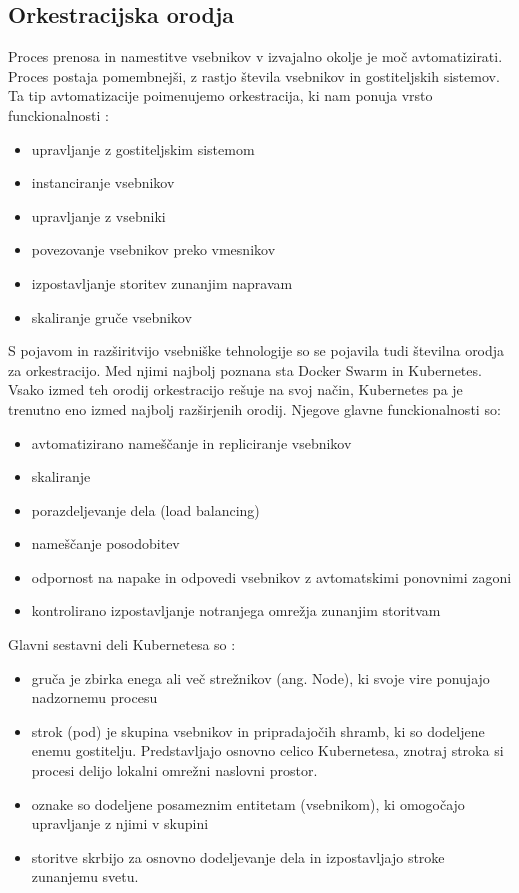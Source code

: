 \documentclass[a4paper, 12pt]{book}
\begin{document}
\subsection{Orkestracijska orodja}

Proces prenosa in namestitve vsebnikov v izvajalno okolje je moč avtomatizirati.
Proces postaja pomembnejši, z rastjo števila vsebnikov in gostiteljskih sistemov. 
Ta tip avtomatizacije poimenujemo orkestracija, ki nam ponuja vrsto funckionalnosti \cite{mongoKubernetes}:
\begin{itemize}
	\item upravljanje z gostiteljskim sistemom
	\item instanciranje vsebnikov
	\item upravljanje z vsebniki
	\item povezovanje vsebnikov preko vmesnikov
	\item izpostavljanje storitev zunanjim napravam
	\item skaliranje gruče vsebnikov
\end{itemize}

S pojavom in razširitvijo vsebniške tehnologije so se pojavila tudi številna orodja za orkestracijo.
Med njimi najbolj poznana sta Docker Swarm in Kubernetes.
Vsako izmed teh orodij orkestracijo rešuje na svoj način, Kubernetes pa je trenutno eno izmed najbolj razširjenih orodij.
Njegove glavne funckionalnosti so:
\begin{itemize}
	\item avtomatizirano nameščanje in repliciranje vsebnikov
	\item skaliranje
	\item porazdeljevanje dela (load balancing)
	\item nameščanje posodobitev
	\item odpornost na napake in odpovedi vsebnikov z avtomatskimi ponovnimi zagoni
	\item kontrolirano izpostavljanje notranjega omrežja zunanjim storitvam
\end{itemize}

Glavni sestavni deli Kubernetesa so \cite{mongoKubernetes}: 
\begin{itemize}
	\item gruča je zbirka enega ali več strežnikov (ang. Node), ki svoje vire ponujajo nadzornemu procesu
	\item strok (pod) je skupina vsebnikov in pripradajočih shramb, ki so dodeljene enemu gostitelju. Predstavljajo osnovno celico Kubernetesa, znotraj stroka si procesi delijo lokalni omrežni naslovni prostor.
	\item oznake so dodeljene posameznim entitetam (vsebnikom), ki omogočajo upravljanje z njimi v skupini
	\item storitve skrbijo za osnovno dodeljevanje dela in izpostavljajo stroke zunanjemu svetu.
\end{itemize}
\end{document}
